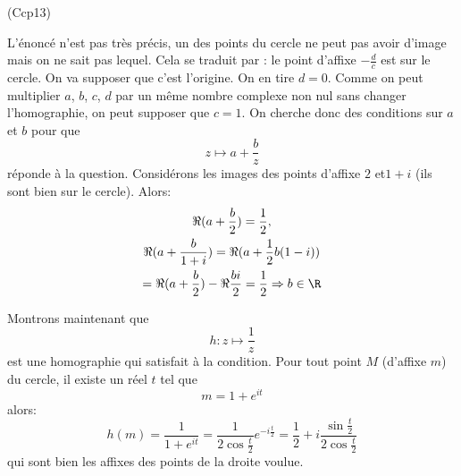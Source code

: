 \begin{tiny}(Ccp13)\end{tiny} L'énoncé n'est pas très précis, un des points du cercle ne peut pas avoir d'image mais on ne sait pas lequel. Cela se traduit par : le point d'affixe $-\frac{d}{c}$ est sur le cercle. \newline
On va supposer que c'est l'origine. On en tire $d=0$. Comme on peut multiplier $a$, $b$, $c$, $d$ par un même nombre complexe non nul sans changer l'homographie, on peut supposer que $c=1$.\newline
On cherche donc des conditions sur $a$ et $b$ pour que
\begin{displaymath}
  z \mapsto a + \frac{b}{z}
\end{displaymath}
réponde à la question.\newline
Considérons les images des points d'affixe $2$ et$1+i$ (ils sont bien sur le cercle). Alors:
\begin{multline*}
\Re(a+\frac{b}{2})=\frac{1}{2},\\
\Re(a+\frac{b}{1+i})= \Re(a+\frac{1}{2}b(1-i)) \\ 
= \Re(a+\frac{b}{2}) -\Re\frac{bi}{2} =\frac{1}{2}
\Rightarrow b \in \R
\end{multline*}

Montrons maintenant que
\begin{displaymath}
 h:  z \mapsto \frac{1}{z}
\end{displaymath}
est une homographie qui satisfait à la condition.\newline
Pour tout point $M$ (d'affixe $m$) du cercle, il existe un réel $t$ tel que
\begin{displaymath}
  m = 1+e^{it}
\end{displaymath}
alors:
\begin{displaymath}
  h(m)=\frac{1}{1+e^{it}} = \frac{1}{2\cos\frac{t}{2}}e^{-i\frac{t}{2}}
  = \frac{1}{2}+i\frac{\sin\frac{t}{2}}{2\cos\frac{t}{2}}
\end{displaymath}
qui sont bien les affixes des points de la droite voulue.
